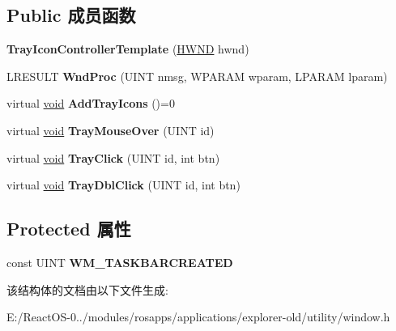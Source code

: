 \subsection*{Public 成员函数}
\begin{DoxyCompactItemize}
\item 
\mbox{\label{struct_tray_icon_controller_template_a4c5bb781fc31193e9fdfa27a939c70ce}} 
{\bfseries Tray\+Icon\+Controller\+Template} (\hyperlink{interfacevoid}{H\+W\+ND} hwnd)
\item 
\mbox{\label{struct_tray_icon_controller_template_aeff28b70b0d0d2d9ff118363f685a3d1}} 
L\+R\+E\+S\+U\+LT {\bfseries Wnd\+Proc} (U\+I\+NT nmsg, W\+P\+A\+R\+AM wparam, L\+P\+A\+R\+AM lparam)
\item 
\mbox{\label{struct_tray_icon_controller_template_a94196cb74928d1ee5af9281a3d7d1ac7}} 
virtual \hyperlink{interfacevoid}{void} {\bfseries Add\+Tray\+Icons} ()=0
\item 
\mbox{\label{struct_tray_icon_controller_template_af6ff284e0b80b676eaa74ef49fd8d0db}} 
virtual \hyperlink{interfacevoid}{void} {\bfseries Tray\+Mouse\+Over} (U\+I\+NT id)
\item 
\mbox{\label{struct_tray_icon_controller_template_a75d15588670be40b4e8aaa44b7e75c86}} 
virtual \hyperlink{interfacevoid}{void} {\bfseries Tray\+Click} (U\+I\+NT id, int btn)
\item 
\mbox{\label{struct_tray_icon_controller_template_a4e25712c87ab31e0a3b11eee2d3add19}} 
virtual \hyperlink{interfacevoid}{void} {\bfseries Tray\+Dbl\+Click} (U\+I\+NT id, int btn)
\end{DoxyCompactItemize}
\subsection*{Protected 属性}
\begin{DoxyCompactItemize}
\item 
\mbox{\label{struct_tray_icon_controller_template_a27a8da22922b1ea66f8cc1a2cb94fe31}} 
const U\+I\+NT {\bfseries W\+M\+\_\+\+T\+A\+S\+K\+B\+A\+R\+C\+R\+E\+A\+T\+ED}
\end{DoxyCompactItemize}


该结构体的文档由以下文件生成\+:\begin{DoxyCompactItemize}
\item 
E\+:/\+React\+O\+S-\/0../modules/rosapps/applications/explorer-\/old/utility/window.\+h\end{DoxyCompactItemize}
